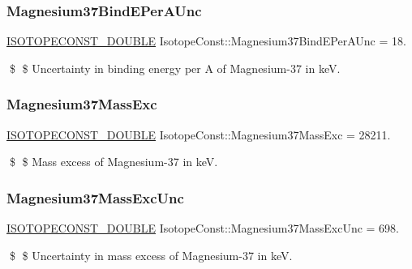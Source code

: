 \subsubsection{\texorpdfstring{Magnesium37\+Bind\+E\+Per\+A\+Unc}{Magnesium37BindEPerAUnc}}
{\footnotesize\ttfamily \mbox{\hyperlink{group___isotope_const-_macros_ga8f45a7272ce02c0b4c65c44636ed719a}{I\+S\+O\+T\+O\+P\+E\+C\+O\+N\+S\+T\+\_\+\+D\+O\+U\+B\+LE}} Isotope\+Const\+::\+Magnesium37\+Bind\+E\+Per\+A\+Unc = 18.}

\$ \$ Uncertainty in binding energy per A of Magnesium-\/37 in keV. \mbox{\label{group___isotope_const-_magnesium-_mg37_ga5cbd4c78488270307aff14d234ff3f1a}} 
\subsubsection{\texorpdfstring{Magnesium37\+Mass\+Exc}{Magnesium37MassExc}}
{\footnotesize\ttfamily \mbox{\hyperlink{group___isotope_const-_macros_ga8f45a7272ce02c0b4c65c44636ed719a}{I\+S\+O\+T\+O\+P\+E\+C\+O\+N\+S\+T\+\_\+\+D\+O\+U\+B\+LE}} Isotope\+Const\+::\+Magnesium37\+Mass\+Exc = 28211.}

\$ \$ Mass excess of Magnesium-\/37 in keV. \mbox{\label{group___isotope_const-_magnesium-_mg37_gad9c9dff8a146ee47b2bfffa5f3009480}} 
\subsubsection{\texorpdfstring{Magnesium37\+Mass\+Exc\+Unc}{Magnesium37MassExcUnc}}
{\footnotesize\ttfamily \mbox{\hyperlink{group___isotope_const-_macros_ga8f45a7272ce02c0b4c65c44636ed719a}{I\+S\+O\+T\+O\+P\+E\+C\+O\+N\+S\+T\+\_\+\+D\+O\+U\+B\+LE}} Isotope\+Const\+::\+Magnesium37\+Mass\+Exc\+Unc = 698.}

\$ \$ Uncertainty in mass excess of Magnesium-\/37 in keV. \mbox{\label{group___isotope_const-_magnesium-_mg37_ga7be16a727c5d632d7a1c33e683cbb4e8}} 
